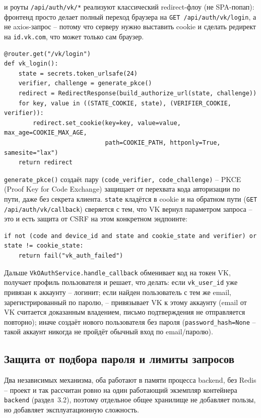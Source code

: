  и роуты
\texttt{/api/auth/vk/*} реализуют классический redirect-флоу (не
SPA-попап): фронтенд просто делает полный переход браузера на
\texttt{GET /api/auth/vk/login}, а не axios-запрос -- потому что серверу
нужно выставить cookie и сделать редирект на \texttt{id.vk.com}, что
может только сам браузер.
\begin{verbatim}
@router.get("/vk/login")
def vk_login():
    state = secrets.token_urlsafe(24)
    verifier, challenge = generate_pkce()
    redirect = RedirectResponse(build_authorize_url(state, challenge))
    for key, value in ((STATE_COOKIE, state), (VERIFIER_COOKIE, verifier)):
        redirect.set_cookie(key=key, value=value, max_age=COOKIE_MAX_AGE,
                            path=COOKIE_PATH, httponly=True, samesite="lax")
    return redirect
\end{verbatim}
\texttt{generate_pkce()} создаёt пару \texttt{(code_verifier,
code_challenge)} -- PKCE (Proof Key for Code Exchange) защищает от
перехвата кода авторизации по пути, даже без секрета клиента. \texttt{state}
кладётся в cookie и на обратном пути (\texttt{GET /api/auth/vk/callback})
сверяется с тем, что VK вернул параметром запроса -- это и есть защита от
CSRF на этом конкретном эндпоинте:
\begin{verbatim}
if not (code and device_id and state and cookie_state and verifier) or state != cookie_state:
    return fail("vk_auth_failed")
\end{verbatim}
Дальше \texttt{VkOAuthService.handle_callback} обменивает код на токен
VK, получает профиль пользователя и решает, что делать: если
\texttt{vk_user_id} уже привязан к аккаунту -- логинит; если найден
пользователь с тем же email, зарегистрированный по паролю, -- привязывает
VK к этому аккаунту (email от VK считается доказанным владением, письмо
подтверждения не отправляется повторно); иначе создаёт нового
пользователя без пароля (\texttt{password_hash=None} -- такой аккаунт
никогда не пройдёт обычный вход по email/паролю).

\subsection{Защита от подбора пароля и лимиты запросов}

Два независимых механизма, оба работают в памяти процесса backend, без
Redis -- проект и так рассчитан ровно на один работающий экземпляр
контейнера \texttt{backend} (раздел~3.2), поэтому отдельное общее
хранилище не добавляет пользы, но добавляет эксплуатационную сложность.

